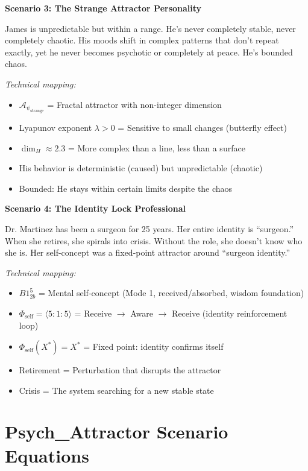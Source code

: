\documentclass[11pt,twoside]{book}
\newcommand{\Frac}{\Phi}
\newcommand{\HausdorffDim}{\dim_H}
\newcommand{\PsychAttractor}{\mathcal{A}_\psi}
\begin{document}
\begin{tcolorbox}[colback=yellow!5!white,colframe=yellow!65!black,title=\textbf{Real-Life Scenarios: Psychological Attractors},breakable]
\textbf{Scenario 3: The Strange Attractor Personality}

James is unpredictable but within a range. He's never completely stable, never completely chaotic. His moods shift in complex patterns that don't repeat exactly, yet he never becomes psychotic or completely at peace. He's bounded chaos.

\textit{Technical mapping:}
\begin{itemize}
    \item $\PsychAttractor_{\mathrm{strange}}$ = Fractal attractor with non-integer dimension
    \item Lyapunov exponent $\lambda > 0$ = Sensitive to small changes (butterfly effect)
    \item $\HausdorffDim \approx 2.3$ = More complex than a line, less than a surface
    \item His behavior is deterministic (caused) but unpredictable (chaotic)
    \item Bounded: He stays within certain limits despite the chaos
\end{itemize}

\textbf{Scenario 4: The Identity Lock Professional}

Dr. Martinez has been a surgeon for 25 years. Her entire identity is ``surgeon.'' When she retires, she spirals into crisis. Without the role, she doesn't know who she is. Her self-concept was a fixed-point attractor around ``surgeon identity.''

\textit{Technical mapping:}
\begin{itemize}
    \item $B1^5_{2b}$ = Mental self-concept (Mode 1, received/absorbed, wisdom foundation)
    \item $\Frac_{\mathrm{self}} = \langle 5:1:5 \rangle$ = Receive $\to$ Aware $\to$ Receive (identity reinforcement loop)
    \item $\Frac_{\mathrm{self}}(X^*) = X^*$ = Fixed point: identity confirms itself
    \item Retirement = Perturbation that disrupts the attractor
    \item Crisis = The system searching for a new stable state
\end{itemize}

\end{tcolorbox}

\section{Psych\_Attractor Scenario Equations}
\end{document}
